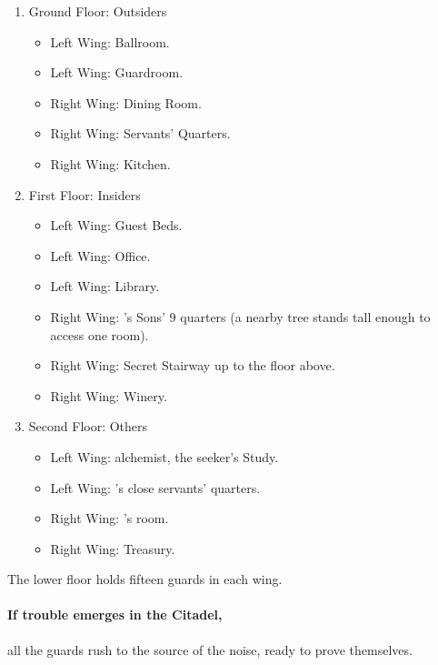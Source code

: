 \begin{enumerate}

  \item{Ground Floor: Outsiders}
    \begin{itemize}
      \item{Left Wing: Ballroom.}
      \item
      Left Wing: Guardroom.
      \item
      Right Wing: Dining Room.
      \item
      Right Wing: Servants' Quarters.
      \item
      Right Wing: Kitchen.
    \end{itemize}
  \item{First Floor: Insiders}
    \begin{itemize}
      \item
      Left Wing: Guest Beds.
      \item
      Left Wing: Office.
      \item
      Left Wing: Library.
      \item
      Right Wing: 's Sons' 9 quarters (a nearby tree stands tall enough to access one room).
      \item
      Right Wing: Secret Stairway up to the floor above.
      \item
      Right Wing: Winery.
    \end{itemize}

  \item
  Second Floor: Others
    \begin{itemize}
      \item
      Left Wing: \gls{alchemist}, the \gls{seeker}'s Study.
      \item
      Left Wing: 's close servants' quarters.
      \item
      Right Wing: 's room.
      \item
      Right Wing: Treasury.
    \end{itemize}

\end{enumerate}

The lower floor holds fifteen guards in each wing.


\paragraph{If trouble emerges in the Citadel,}
all the guards rush to the source of the noise, ready to prove themselves.

